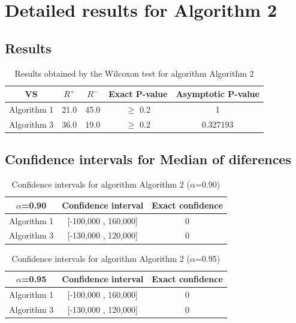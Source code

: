 \documentclass[a4paper,10pt]{article}
\begin{document}
 \clearpage 


\section{Detailed results for Algorithm 2}


\subsection{Results}

\begin{table}[!htp]
\centering\small
\begin{tabular}{
|c|c|c|c|c|}
\hline
 VS & $R^{+}$ & $R^{-}$ & Exact P-value & Asymptotic P-value \\ \hline 
Algorithm 1 & 21.0 & 45.0 & $\geq$ 0.2 & 1\\ \hline 
Algorithm 3 & 36.0 & 19.0 & $\geq$ 0.2 & 0.327193\\ \hline 

\end{tabular}
\caption{Results obtained by the Wilcoxon test for algorithm Algorithm 2}
\end{table}

\subsection{Confidence intervals for Median of diferences}

\begin{table}[!htp]
\centering\small
\begin{tabular}{
|c|c|c|}
\hline
 $\alpha$=0.90 & Confidence interval & Exact confidence \\ \hline 
Algorithm 1 & [-100,000 , 160,000] & 0\\ \hline 
Algorithm 3 & [-130,000 , 120,000] & 0\\ \hline 

\end{tabular}
\caption{Confidence intervals for algorithm Algorithm 2 ($\alpha$=0.90)}
\end{table}
\begin{table}[!htp]
\centering\small
\begin{tabular}{
|c|c|c|}
\hline
 $\alpha$=0.95 & Confidence interval & Exact confidence \\ \hline 
Algorithm 1 & [-100,000 , 160,000] & 0\\ \hline 
Algorithm 3 & [-130,000 , 120,000] & 0\\ \hline 

\end{tabular}
\caption{Confidence intervals for algorithm Algorithm 2 ($\alpha$=0.95)}
\end{table}
\end{document}
